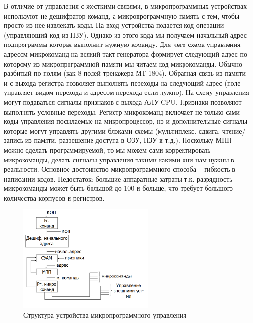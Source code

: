 \documentclass[unicode, 12pt, a4paper, oneside]{article}
\begin{document}
В отличие от управления с жесткими связями, в микропрограммных устройствах используют не дешифратор команд, а микропрограммную память с тем, чтобы просто из нее извлекать коды. На вход устройства подается код операции (управляющий код из ПЗУ). Однако из этого кода мы получаем начальный адрес подпрограммы которая выполнит нужную команду. Для чего схема управления адресом микрокоманд на всякий такт генератора формирует следующий адрес по которому из микропрограммной памяти мы читаем код микрокоманды. Обычно разбитый по полям (как 8 полей тренажера МТ 1804). Обратная связь из памяти и с выхода регистра позволяет выполнять переходы на следующий адрес (поле управляет видом перехода и адресом перехода если нужно). На схему управления могут подаваться сигналы признаков с выхода АЛУ CPU. Признаки позволяют выполнять условные переходы. Регистр микрокоманд включает не только сами коды управления посылаемые на микропроцессор, но и дополнительные сигналы которые могут управлять другими блоками схемы (мультиплекс. сдвига, чтение/запись из памяти, разрешение доступа в ОЗУ, ПЗУ и т.д.). Поскольку МПП можно сделать программируемой, то мы можем сами корректировать микрокоманды, делать сигналы управления такими какими они нам нужны в реальности. Основное достоинство микропрограммного способа – гибкость в написании кодов.
Недостаток: большие аппаратные затраты т.к. разрядность микрокоманды может быть большой до 100 и больше, что требует большого количества корпусов и регистров. 

\begin{center}
\begin{figure}[H]
\centering
\includegraphics[width=0.6\textwidth]{110_struct.png}
\caption{Структура устройства микропрограммного управления}
\end{figure}  
\end{center}

\end{document}
